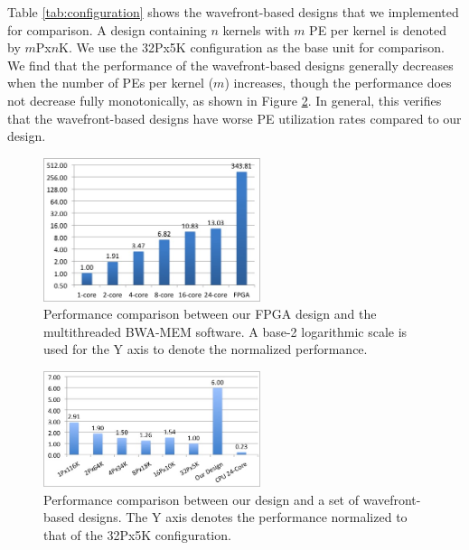 Table \ref{tab:configuration} shows the wavefront-based designs that we implemented for comparison. 
A design containing $n$ kernels with $m$ PE per kernel is denoted by $m$Px$n$K. 
We use the 32Px5K configuration as the base unit for comparison.
We find that the performance of the wavefront-based designs generally decreases when the number of PEs per kernel ($m$) increases, though the performance does not decrease fully monotonically, as shown in Figure \ref{fig:F2C5}.
In general, this verifies that the wavefront-based designs have worse PE utilization rates compared to our design. 

\begin{figure}[!hbt]
	\begin{center}
		\includegraphics[width=2.5in]{Figures/F1C5.jpg}
		\caption {Performance comparison between our FPGA design and the multithreaded BWA-MEM software. A base-2 logarithmic scale is used for the Y axis to denote the normalized performance.}
		\label{fig:F1C5}
	\end{center}
\end{figure}
\vspace{-20pt}

\begin{figure}[!hbt]
	\begin{center}
		\includegraphics[width=2.5in]{Figures/F2C5.jpg}
		\caption {Performance comparison between our design and a set of wavefront-based designs. The Y axis denotes the performance normalized to that of the 32Px5K configuration.}
		\label{fig:F2C5}
	\end{center}
\end{figure}
\vspace{-10pt}


